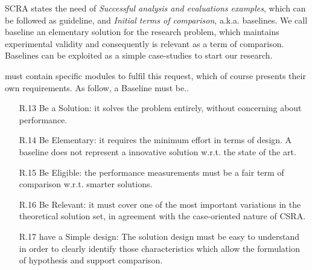 SCRA states the need of \textit{Successful analysis and evaluations examples}, which can be followed as guideline, and \textit{Initial terms of comparison}, a.k.a. baselines. We call baseline  an elementary solution for the research problem, which maintains experimental validity and consequently is relevant as a term of comparison. Baselines can be exploited as a simple case-studies to start our research.

\name must contain specific modules to fulfil this request, which of course presents their own requirements. As follow, a Baseline must be.. 

\begin{enumerate}
\item[R.13] Be a Solution: it solves the problem entirely, without concerning about performance. %
\item[R.14] Be Elementary: it requires the minimum effort in terms of design. A baseline does not represent a innovative solution w.r.t. the state of the art.  %
\item[R.15] Be Eligible: the performance measurements must be a fair term of comparison w.r.t. smarter solutions. %
\item[R.16] Be Relevant: it must cover one of the most important variations in the theoretical solution set, in agreement with the case-oriented nature of CSRA. %
\item[R.17] have a Simple design: The solution design must be easy to understand in order to clearly identify those characteristics which allow the formulation of hypothesis and support comparison.  %
\end{enumerate}



